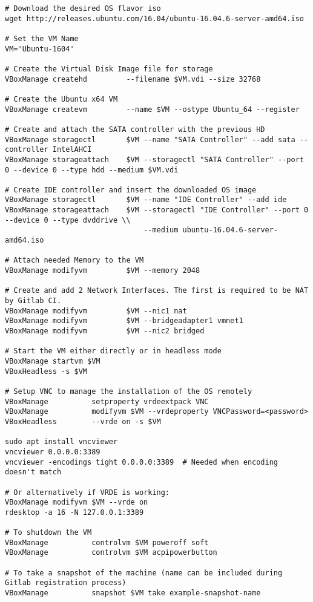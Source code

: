 \begin{lstlisting}[frame=single, basicstyle=\tiny]
# Download the desired OS flavor iso
wget http://releases.ubuntu.com/16.04/ubuntu-16.04.6-server-amd64.iso

# Set the VM Name
VM='Ubuntu-1604'

# Create the Virtual Disk Image file for storage
VBoxManage createhd         --filename $VM.vdi --size 32768

# Create the Ubuntu x64 VM
VBoxManage createvm         --name $VM --ostype Ubuntu_64 --register

# Create and attach the SATA controller with the previous HD
VBoxManage storagectl       $VM --name "SATA Controller" --add sata --controller IntelAHCI
VBoxManage storageattach    $VM --storagectl "SATA Controller" --port 0 --device 0 --type hdd --medium $VM.vdi

# Create IDE controller and insert the downloaded OS image
VBoxManage storagectl       $VM --name "IDE Controller" --add ide
VBoxManage storageattach    $VM --storagectl "IDE Controller" --port 0 --device 0 --type dvddrive \\
                                --medium ubuntu-16.04.6-server-amd64.iso
    
# Attach needed Memory to the VM
VBoxManage modifyvm         $VM --memory 2048

# Create and add 2 Network Interfaces. The first is required to be NAT by Gitlab CI.
VBoxManage modifyvm         $VM --nic1 nat
VBoxManage modifyvm         $VM --bridgeadapter1 vmnet1
VBoxManage modifyvm         $VM --nic2 bridged

# Start the VM either directly or in headless mode
VBoxManage startvm $VM
VBoxHeadless -s $VM

# Setup VNC to manage the installation of the OS remotely
VBoxManage          setproperty vrdeextpack VNC
VBoxManage          modifyvm $VM --vrdeproperty VNCPassword=<password>
VBoxHeadless        --vrde on -s $VM

sudo apt install vncviewer
vncviewer 0.0.0.0:3389
vncviewer -encodings tight 0.0.0.0:3389  # Needed when encoding doesn't match

# Or alternatively if VRDE is working:
VBoxManage modifyvm $VM --vrde on
rdesktop -a 16 -N 127.0.0.1:3389

# To shutdown the VM
VBoxManage          controlvm $VM poweroff soft
VBoxManage          controlvm $VM acpipowerbutton

# To take a snapshot of the machine (name can be included during Gitlab registration process)
VBoxManage          snapshot $VM take example-snapshot-name



\end{lstlisting}
